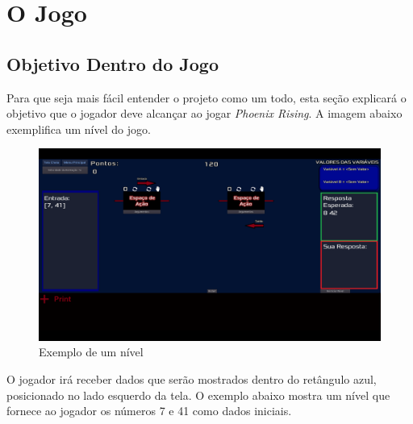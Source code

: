 \chapter{O Jogo}
\label{cap:introducao}

\section{Objetivo Dentro do Jogo}
\label{sec:consideracoes_preliminares}

Para que seja mais fácil entender o projeto como um todo, esta seção explicará
o objetivo que o jogador deve alcançar ao jogar 
\textit{Phoenix Rising}. A imagem abaixo exemplifica um nível do jogo.

\begin{figure}[H]
    \includegraphics[width=\textwidth]{../figuras/exemplo_nivel.png}
    \caption{Exemplo de um nível}
\end{figure}

O jogador irá receber dados que serão mostrados dentro do retângulo azul, 
posicionado no lado esquerdo da tela. O exemplo abaixo mostra um nível que
fornece  ao jogador os números 7 e 41 como dados iniciais.

